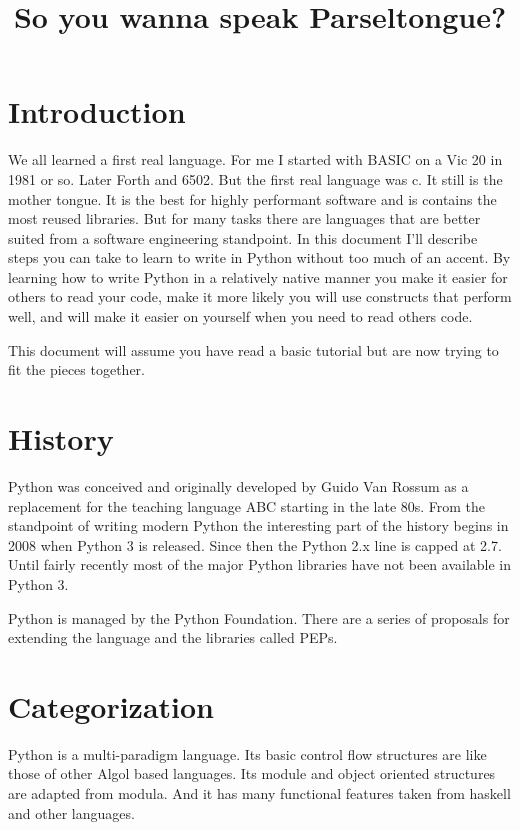 \documentclass[]{article}
\title{So you wanna speak Parseltongue?}
\author{}
\date{}
\begin{document}
\maketitle

\tableofcontents

\section{Introduction}

We all learned a first real language. For me I started with BASIC on a
Vic 20 in 1981 or so. Later Forth and 6502. But the first real
language was c. It still is the mother tongue. It is the best for
highly performant software and is contains the most reused libraries.
But for many tasks there are languages that are better suited from a
software engineering standpoint. In this document I'll describe steps
you can take to learn to write in Python without too much of an accent.
By learning how to write Python in a relatively native manner you make
it easier for others to read your code, make it more likely you will use
constructs that perform well, and will make it easier on yourself when
you need to read others code.

This document will assume you have read a basic tutorial but are now
trying to fit the pieces together.

\section{History}

Python was conceived and originally developed by Guido Van Rossum as a
replacement for the teaching language ABC starting in the late 80s.
From the standpoint of writing modern Python the interesting part of
the history begins in 2008 when Python 3 is released. Since then the
Python 2.x line is capped at 2.7. Until fairly recently most of the
major Python libraries have not been available in Python 3.

Python is managed by the Python Foundation. There are a series of
proposals for extending the language and the libraries called PEPs.

\section{Categorization}

Python is a multi-paradigm language. Its basic control flow structures
are like those of other Algol based languages. Its module and object
oriented structures are adapted from modula. And it has many functional
features taken from haskell and other languages.
\end{document}
